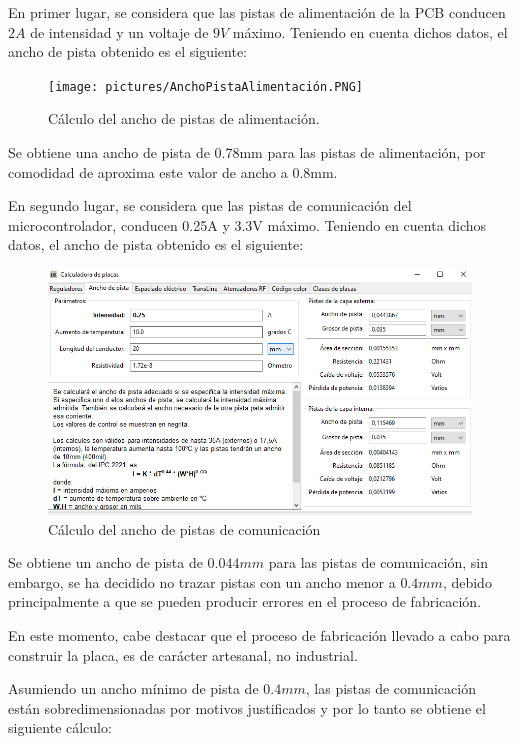 En primer lugar, se considera que las pistas de alimentación de la \ac{PCB} conducen $2A$ de intensidad y un voltaje de $9V$ máximo. Teniendo en cuenta dichos datos, el ancho de pista obtenido es el siguiente:

\begin{figure}[H]
\centering 
\texttt{[image: pictures/AnchoPistaAlimentación.PNG]}
\caption{Cálculo del ancho de pistas de alimentación.}
\label{fig:CAMBIAR!!!!!!!!!!}
\end{figure}
 
 Se obtiene una ancho de pista de 0.78mm para las pistas de alimentación, por comodidad de aproxima este valor de ancho a 0.8mm.
 
 En segundo lugar, se considera que las pistas de comunicación del microcontrolador, conducen 0.25A y 3.3V máximo. Teniendo en cuenta dichos datos, el ancho de pista obtenido es el siguiente:
 
\begin{figure}[H]
\centering 
\includegraphics[width=0.9\linewidth]{pictures/AnchoPistaRestoMinimo.PNG}
\caption{Cálculo del ancho de pistas de comunicación}
\label{fig:CAMBIAR!!!!!!!!!!}
\end{figure}

Se obtiene un ancho de pista de $0.044mm$ para las pistas de comunicación, sin embargo, se ha decidido no trazar pistas con un ancho menor a $0.4mm$, debido principalmente a que se pueden producir errores en el proceso de fabricación.

En este momento, cabe destacar que el proceso de fabricación llevado a cabo para construir la placa, es de carácter artesanal, no industrial.

Asumiendo un ancho mínimo de pista de $0.4mm$, las pistas de comunicación están sobredimensionadas por motivos justificados y por lo tanto se obtiene el siguiente cálculo:

